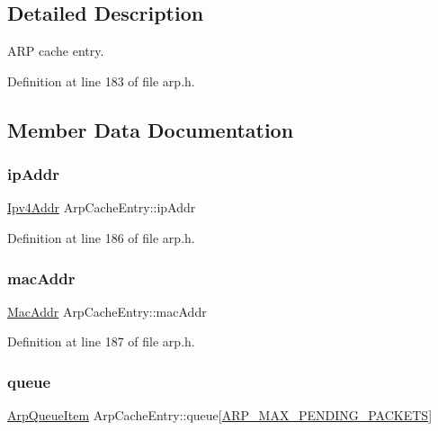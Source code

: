 \subsection{Detailed Description}
A\+RP cache entry. 

Definition at line 183 of file arp.\+h.



\subsection{Member Data Documentation}
\mbox{\label{structArpCacheEntry_a1bea163ecbcefd764974eda38077edf1}} 
\subsubsection{\texorpdfstring{ip\+Addr}{ipAddr}}
{\footnotesize\ttfamily \hyperlink{ipv4_8h_a411debb3d770caa0c06d3f73367da37f}{Ipv4\+Addr} Arp\+Cache\+Entry\+::ip\+Addr}



Definition at line 186 of file arp.\+h.

\mbox{\label{structArpCacheEntry_a48913a7a1aa68c83f6a34fa71091acb0}} 
\subsubsection{\texorpdfstring{mac\+Addr}{macAddr}}
{\footnotesize\ttfamily \hyperlink{ethernet_8h_a1e00ed3977e8a770e8b4ae4cb306d1c0}{Mac\+Addr} Arp\+Cache\+Entry\+::mac\+Addr}



Definition at line 187 of file arp.\+h.

\mbox{\label{structArpCacheEntry_a217e54562a6d3c279ce48e8a4b26b1ce}} 
\subsubsection{\texorpdfstring{queue}{queue}}
{\footnotesize\ttfamily \hyperlink{structArpQueueItem}{Arp\+Queue\+Item} Arp\+Cache\+Entry\+::queue\mbox{[}\hyperlink{net__config_8h_a7f10c703fc244856512502b9d37fe636}{A\+R\+P\+\_\+\+M\+A\+X\+\_\+\+P\+E\+N\+D\+I\+N\+G\+\_\+\+P\+A\+C\+K\+E\+TS}\mbox{]}}



